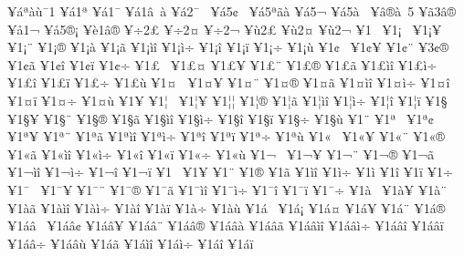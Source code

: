 {^^a5^^e1^^aa^^e0^^f9^^af1
^^a5^^e11^^aa
^^a5^^e11^^af
^^a5^^e11^^e2^^a0^^e0
^^a5^^e12^^af^^a0
^^a5^^e15^^a2^^a0
^^a5^^e15^^aa^^e3^^e0
^^a5^^e15^^ac
^^a5^^e15^^e0^^a0
^^a5^^e2^^ae^^e0^^a05
^^a5^^e33^^e2^^ae
^^a5^^e51^^ac
^^a5^^e55^^ae^^a1
^^a5^^e81^^e2^^ae
^^a5^^f72^^a3
^^a5^^f72^^a4
^^a5^^f72^^ac
^^a5^^f92^^a3
^^a5^^f92^^a4
^^a5^^f92^^ac
^^a51^^a0
^^a51^^a1^^a0
^^a51^^a1^^a5
^^a51^^a1^^a8
^^a51^^a1^^ae
^^a51^^a1^^e0
^^a51^^a1^^e3
^^a51^^a1^^ec^^ee
^^a51^^a1^^ec^^f7
^^a51^^a1^^ee
^^a51^^a1^^ef
^^a51^^a1^^f7
^^a51^^a1^^f9
^^a51^^a2^^a0
^^a51^^a2^^a5
^^a51^^a2^^a8
^^a53^^a2^^ae
^^a51^^a2^^e3
^^a51^^a2^^ee
^^a51^^a2^^ef
^^a51^^a2^^f7
^^a51^^a3^^a0
^^a51^^a3^^a4
^^a51^^a3^^a5
^^a51^^a3^^a8
^^a51^^a3^^ae
^^a51^^a3^^e3
^^a51^^a3^^ec^^ee
^^a51^^a3^^ec^^f7
^^a51^^a3^^ee
^^a51^^a3^^ef
^^a51^^a3^^f7
^^a51^^a3^^f9
^^a51^^a4^^a0
^^a51^^a4^^a5
^^a51^^a4^^a8
^^a51^^a4^^ae
^^a51^^a4^^e3
^^a51^^a4^^ec^^ee
^^a51^^a4^^ec^^f7
^^a51^^a4^^ee
^^a51^^a4^^ef
^^a51^^a4^^f7
^^a51^^a4^^f9
^^a51^^a5
^^a51^^a6^^a0
^^a51^^a6^^a5
^^a51^^a6^^a6
^^a51^^a6^^ae
^^a51^^a6^^e3
^^a51^^a6^^ec^^ee
^^a51^^a6^^ec^^f7
^^a51^^a6^^ee
^^a51^^a6^^ef
^^a51^^a7^^a0
^^a51^^a7^^a5
^^a51^^a7^^a8
^^a51^^a7^^ae
^^a51^^a7^^e3
^^a51^^a7^^ec^^ee
^^a51^^a7^^ec^^f7
^^a51^^a7^^ee
^^a51^^a7^^ef
^^a51^^a7^^f7
^^a51^^a7^^f9
^^a51^^a8
^^a51^^aa^^a0
^^a51^^aa^^a2
^^a51^^aa^^a5
^^a51^^aa^^a8
^^a51^^aa^^e3
^^a51^^aa^^ec^^ee
^^a51^^aa^^ec^^f7
^^a51^^aa^^ee
^^a51^^aa^^ef
^^a51^^aa^^f7
^^a51^^aa^^f9
^^a51^^ab^^a0
^^a51^^ab^^a5
^^a51^^ab^^a8
^^a51^^ab^^ae
^^a51^^ab^^e3
^^a51^^ab^^ec^^ee
^^a51^^ab^^ec^^f7
^^a51^^ab^^ee
^^a51^^ab^^ef
^^a51^^ab^^f7
^^a51^^ab^^f9
^^a51^^ac^^a0
^^a51^^ac^^a5
^^a51^^ac^^a8
^^a51^^ac^^ae
^^a51^^ac^^e3
^^a51^^ac^^ec^^ee
^^a51^^ac^^ec^^f7
^^a51^^ac^^ee
^^a51^^ac^^ef
^^a51^^ad^^a0
^^a51^^ad^^a5
^^a51^^ad^^a8
^^a51^^ad^^ae
^^a51^^ad^^e3
^^a51^^ad^^ec^^ee
^^a51^^ad^^ec^^f7
^^a51^^ad^^ec
^^a51^^ad^^ee
^^a51^^ad^^ef
^^a51^^ad^^f7
^^a51^^af^^a0
^^a51^^af^^a5
^^a51^^af^^a8
^^a51^^af^^ae
^^a51^^af^^e3
^^a51^^af^^ec^^ee
^^a51^^af^^ec^^f7
^^a51^^af^^ee
^^a51^^af^^ef
^^a51^^af^^f7
^^a51^^e0^^a0
^^a51^^e0^^a5
^^a51^^e0^^a8
^^a51^^e0^^e3
^^a51^^e0^^ec^^ee
^^a51^^e0^^ec^^f7
^^a51^^e0^^ee
^^a51^^e0^^ef
^^a51^^e0^^f7
^^a51^^e0^^f9
^^a51^^e1^^a0
^^a51^^e1^^a1
^^a51^^e1^^a4
^^a51^^e1^^a5
^^a51^^e1^^a8
^^a51^^e1^^ae
^^a51^^e1^^e2^^a0
^^a51^^e1^^e2^^a2
^^a51^^e1^^e2^^a5
^^a51^^e1^^e2^^a8
^^a51^^e1^^e2^^ae
^^a51^^e1^^e2^^e0
^^a51^^e1^^e2^^e3
^^a51^^e1^^e2^^ec^^ee
^^a51^^e1^^e2^^ec^^f7
^^a51^^e1^^e2^^ee
^^a51^^e1^^e2^^ef
^^a51^^e1^^e2^^f7
^^a51^^e1^^e2^^f9
^^a51^^e1^^e3
^^a51^^e1^^ec^^ee
^^a51^^e1^^ec^^f7
^^a51^^e1^^ee
^^a51^^e1^^ef
}
